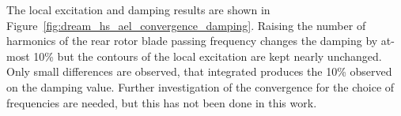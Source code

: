 The local excitation and damping results are 
shown in Figure~\ref{fig:dream_hs_ael_convergence_damping}.
Raising the number of harmonics of the rear rotor blade passing frequency
changes the damping by at-most 10\% but the contours
of the local excitation are kept nearly unchanged. Only small differences
are observed, that integrated produces the 10\%
observed on the damping value. Further investigation of the
convergence for the choice of frequencies are needed, but
this has not been done in this work.
